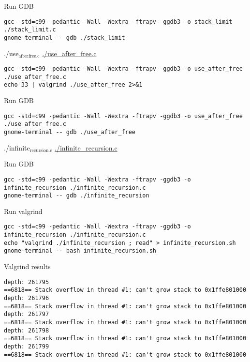 \documentclass[11pt]{article}
\begin{document}
Run GDB
\begin{verbatim}
gcc -std=c99 -pedantic -Wall -Wextra -ftrapv -ggdb3 -o stack_limit ./stack_limit.c
gnome-terminal -- gdb ./stack_limit
\end{verbatim}

\item ./use\(_{\text{after}}\)\(_{\text{free.c}}\)
\label{sec:orga5e4916}
\url{./use\_after\_free.c}

\begin{verbatim}
gcc -std=c99 -pedantic -Wall -Wextra -ftrapv -ggdb3 -o use_after_free ./use_after_free.c
echo 33 | valgrind ./use_after_free 2>&1
\end{verbatim}

Run GDB
\begin{verbatim}
gcc -std=c99 -pedantic -Wall -Wextra -ftrapv -ggdb3 -o use_after_free ./use_after_free.c
gnome-terminal -- gdb ./use_after_free
\end{verbatim}



\item ./infinite\(_{\text{recursion.c}}\)
\label{sec:orgdb4381d}
\url{./infinite\_recursion.c}

Run GDB
\begin{verbatim}
gcc -std=c99 -pedantic -Wall -Wextra -ftrapv -ggdb3 -o infinite_recursion ./infinite_recursion.c
gnome-terminal -- gdb ./infinite_recursion
\end{verbatim}

Run valgrind
\begin{verbatim}
gcc -std=c99 -pedantic -Wall -Wextra -ftrapv -ggdb3 -o infinite_recursion ./infinite_recursion.c
echo "valgrind ./infinite_recursion ; read" > infinite_recursion.sh
gnome-terminal -- bash infinite_recursion.sh 
\end{verbatim}

Valgrind results

\begin{verbatim}
depth: 261795
==6818== Stack overflow in thread #1: can't grow stack to 0x1ffe801000
depth: 261796
==6818== Stack overflow in thread #1: can't grow stack to 0x1ffe801000
depth: 261797
==6818== Stack overflow in thread #1: can't grow stack to 0x1ffe801000
depth: 261798
==6818== Stack overflow in thread #1: can't grow stack to 0x1ffe801000
depth: 261799
==6818== Stack overflow in thread #1: can't grow stack to 0x1ffe801000
\end{verbatim}
\end{document}
